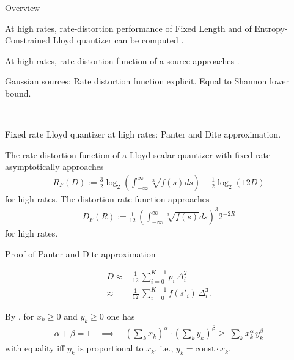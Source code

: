 \begin{frame}{Overview}
\bit
\item At high rates, rate-distortion performance of Fixed Length and of Entropy-Constrained Lloyd quantizer can be computed .
\item {} At high rates, rate-distortion function of a source approaches .
\item Gaussian sources: Rate distortion function explicit. Equal to Shannon lower bound. 
\eit
\bit
\item[\iarrow]   \\
\vspace{4.0ex}
\eit
\end{frame}




%

\begin{frame}{Fixed rate Lloyd quantizer at high rates: Panter and Dite approximation.}
\begin{proposition}
The rate distortion function of a Lloyd scalar quantizer with fixed rate asymptotically approaches
\begin{align*}
R_F(D):=\frac{3}{2}\log_2\left(\int_{-\infty}^{\infty}\sqrt[3]{f(s)}ds \right)-\frac{1}{2}\log_2(12D)
\end{align*}
for high rates. The distortion rate function approaches
\begin{align*}
D_F(R):= \frac{1}{12}\,\left(\int_{-\infty}^{\infty}\sqrt[3]{f(s)}ds \right)^{\!3}
2^{-2R}
\end{align*}
for high rates. 
\end{proposition}
\end{frame}

\begin{frame}{Proof of Panter and Dite approximation}
\bit
\item {}
\begin{align}\label{DistPantDite}
D \approx &\frac{1}{12}\,\sum_{i=0}^{K-1} p_i\,\Delta_i^2\\ \approx &\frac{1}{12}\,\sum_{i=0}^{K-1} f(s'_i)\,\Delta_i^3.
\end{align}
\item By , for $x_k\geq0$ and $y_k\geq0$ one has
  \vspace{-0.5ex}
  \begin{align}\label{Hoeld}
  \alpha+\beta=1
    \quad\implies\quad
    \left(\sum\nolimits_kx_k\right)^{\!\alpha}\!\cdot
    \left(\sum\nolimits_ky_k\right)^{\!\beta}\geq\;
    \sum\nolimits_kx_k^{\alpha}\,y_k^{\beta}
 \end{align}
  with equality iff $y_k$ is proportional to $x_k$, i.e., $y_k=\text{const}\cdot x_k$.
\eit
\end{frame}

